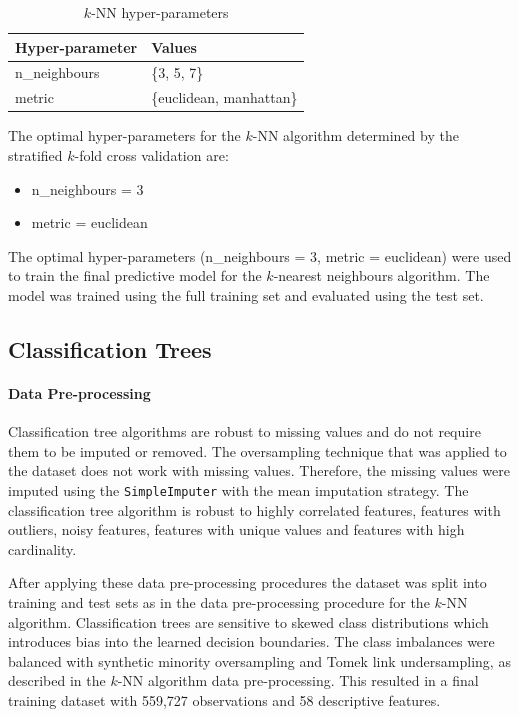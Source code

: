\documentclass[conference]{IEEEtran}
\begin{document}
	\begin{table}[htbp]
		\caption{$k$-NN hyper-parameters}
		\label{tab:knn_param}
		\begin{center}
			\begin{tabular}{|l|l|}
				\hline
				\textbf{Hyper-parameter} & \textbf{Values} \\
				\hline
				n\_neighbours & \{3, 5, 7\} \\
				\hline
				metric & \{euclidean, manhattan\} \\
				\hline
			\end{tabular}
		\end{center}
	\end{table}
	The optimal hyper-parameters for the $k$-NN algorithm determined by the stratified $k$-fold cross validation are:
	\begin{itemize}
		\item n\_neighbours = 3
		\item metric = euclidean
	\end{itemize}
	The optimal hyper-parameters (n\_neighbours = 3, metric = euclidean) were used to train the final predictive model for the $k$-nearest neighbours algorithm. The model was trained using the full training set and evaluated using the test set.
	
	\subsection{Classification Trees}
	\paragraph{Data Pre-processing}
	Classification tree algorithms are robust to missing values and do not require them to be imputed or removed. The oversampling technique that was applied to the dataset does not work with missing values. Therefore, the missing values were imputed using the \texttt{SimpleImputer} with the mean imputation strategy. The classification tree algorithm is robust to highly correlated features, features with outliers, noisy features, features with unique values and features with high cardinality. 
	
	After applying these data pre-processing procedures the dataset was split into training and test sets as in the data pre-processing procedure for the $k$-NN algorithm. Classification trees are sensitive to skewed class distributions which introduces bias into the learned decision boundaries. The class imbalances were balanced with synthetic minority oversampling and Tomek link undersampling, as described in the $k$-NN algorithm data pre-processing. This resulted in a final training dataset with 559,727 observations and 58 descriptive features.
	
\end{document}
